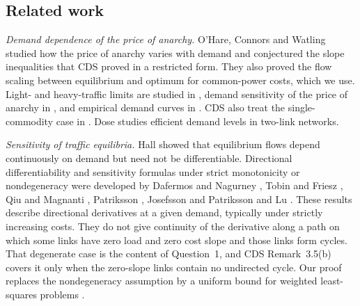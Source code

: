 \subsection{Related work}

\emph{Demand dependence of the price of anarchy.} O'Hare, Connors and Watling \cite{OCW2016} studied how the price of anarchy varies with demand and conjectured the slope inequalities that CDS proved in a restricted form. They also proved the flow scaling between equilibrium and optimum for common-power costs, which we use. Light- and heavy-traffic limits are studied in \cite{CB2020,CB2019,WuMohring2021}, demand sensitivity of the price of anarchy in \cite{WuMohring2023,Englert2010}, and empirical demand curves in \cite{Youn2008,Monnot2017}. CDS also treat the single-commodity case in \cite{CDSMP}. Dose \cite{Dose2026} studies efficient demand levels in two-link networks.

\emph{Sensitivity of traffic equilibria.} Hall \cite{Hall1978} showed that equilibrium flows depend continuously on demand but need not be differentiable. Directional differentiability and sensitivity formulas under strict monotonicity or nondegeneracy were developed by Dafermos and Nagurney \cite{DafermosNagurney1984,Dafermos1988}, Tobin and Friesz \cite{TobinFriesz1988}, Qiu and Magnanti \cite{QiuMagnanti1989}, Patriksson \cite{Patriksson2004}, Josefsson and Patriksson \cite{JP2007} and Lu \cite{Lu2008}. These results describe directional derivatives at a given demand, typically under strictly increasing costs. They do not give continuity of the derivative along a path on which some links have zero load and zero cost slope and those links form cycles. That degenerate case is the content of Question~1, and CDS Remark~3.5(b) covers it only when the zero-slope links contain no undirected cycle. Our proof replaces the nondegeneracy assumption by a uniform bound for weighted least-squares problems \cite{Stewart1989,Forsgren1996}.

